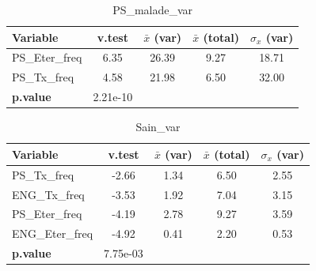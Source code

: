 \documentclass{article}
\begin{document}
\begin{table}[ht]
    \centering
        \begin{tabular}{lcccc}
        \toprule
        \textbf{Variable} & \textbf{v.test} & \textbf{$\bar{x}$ (var)} & \textbf{$\bar{x}$ (total)} & \textbf{$\sigma_x$ (var)} \\
        \midrule
        PS\_Eter\_freq & 6.35 & 26.39 & 9.27 & 18.71 \\
        PS\_Tx\_freq  & 4.58 & 21.98 & 6.50 & 32.00 \\
        \midrule
        \textbf{p.value} & 2.21e-10 & & & \\
        \bottomrule
    \end{tabular}
    \caption{PS\_malade\_var}
\end{table}
    
\begin{table}[ht]
    \centering
    \begin{tabular}{lcccc}
        \toprule
        \textbf{Variable} & \textbf{v.test} & \textbf{$\bar{x}$ (var)} & \textbf{$\bar{x}$ (total)} & \textbf{$\sigma_x$ (var)} \\
        \midrule
        PS\_Tx\_freq    & -2.66 & 1.34 & 6.50 & 2.55 \\
        ENG\_Tx\_freq   & -3.53 & 1.92 & 7.04 & 3.15 \\
        PS\_Eter\_freq  & -4.19 & 2.78 & 9.27 & 3.59 \\
        ENG\_Eter\_freq & -4.92 & 0.41 & 2.20 & 0.53 \\
        \midrule
        \textbf{p.value} & 7.75e-03 & & & \\
        \bottomrule
    \end{tabular}
    \caption{Sain\_var}
\end{table}
\end{document}
